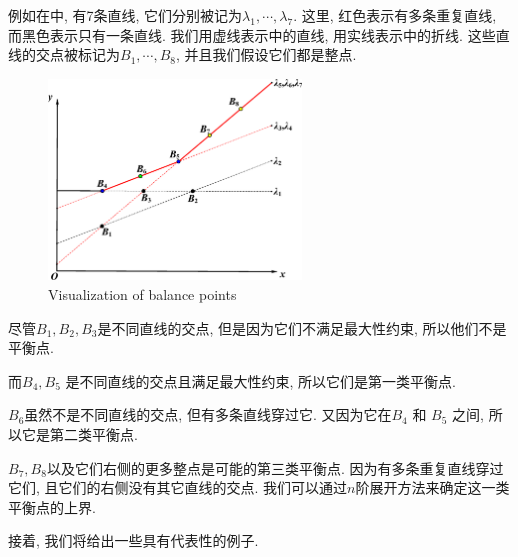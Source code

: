 例如在中, 有7条直线, 它们分别被记为$\lambda_1,\cdots,\lambda_7$. 这里, 红色表示有多条重复直线, 而黑色表示只有一条直线. 我们用虚线表示中的直线, 用实线表示中的折线. 这些直线的交点被标记为$B_1,\cdots,B_8$, 并且我们假设它们都是整点. 
\begin{figure}[H]
\centering
\includegraphics[width=0.6\textwidth]{fig/ps.eps}
\caption{Visualization of balance points}
\label{point}
\end{figure}
\begin{compactitem}[\textbullet]
\item 尽管$B_1,B_2,B_3$是不同直线的交点, 但是因为它们不满足最大性约束, 所以他们不是平衡点. 
\item 而$B_4,B_5$ 是不同直线的交点且满足最大性约束, 所以它们是第一类平衡点.
\item $B_6$虽然不是不同直线的交点, 但有多条直线穿过它. 又因为它在$B_4$ 和 $B_5$ 之间, 所以它是第二类平衡点.
\item $B_7,B_8$以及它们右侧的更多整点是可能的第三类平衡点\BPthree{}. 因为有多条重复直线穿过它们, 且它们的右侧没有其它直线的交点. 我们可以通过$n$阶展开方法来确定这一类平衡点的上界.
\end{compactitem}

接着, 我们将给出一些具有代表性的例子. 

